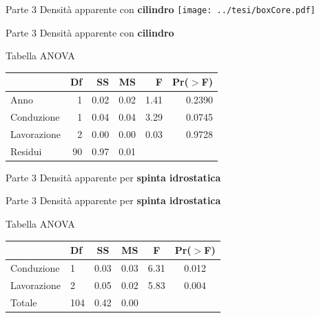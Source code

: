 \documentclass[xcolor={usenames, table, x11names}, final, 10pt]{beamer}
\begin{document}
\begin{frame}[label=Core]{Parte 3 \small{Densità apparente con \bf{\large{cilindro}}}}
  \hyperlink{finale}{}  
  \centering
  \texttt{[image: ../tesi/boxCore.pdf]}
  
\end{frame}

\begin{frame}{Parte 3 \small{Densità apparente con  \bf{\large{cilindro}}}}

  Tabella ANOVA

  \begin{table}[ht]
    \centering
    \label{tab:anova del modello}
    \begin{tabular}{lrrrrr}
      \toprule
      & Df & SS & MS & F  & Pr($>$F) \\ 
      \midrule 
      Anno         & 1  &  0.02  &  0.02  &   1.41   & 0.2390   \\ 
      Conduzione   & 1  &  0.04  &  0.04  &   3.29   & 0.0745   \\ 
      Lavorazione  & 2  &  0.00  &  0.00  &   0.03   & 0.9728   \\ 
      Residui      & 90 &  0.97  &  0.01  &          &          \\ 
      \bottomrule
    \end{tabular}
  \end{table}
\end{frame}

\begin{frame}[label=Clod]{Parte 3 \small{Densità apparente per \bf{\large{spinta idrostatica}}}}
  \hyperlink{finale}{}
\end{frame}

\begin{frame}{Parte 3 \small{Densità apparente per \bf{\large{spinta idrostatica}}}}

  Tabella ANOVA

  
  \begin{table}
    \centering
    \begin{tabular}{llcccc}
      \toprule
      & Df  & SS & MS & F & Pr($>$F) \\ 
      \midrule
      Conduzione  & 1   & 0.03   & 0.03    & 6.31    & 0.012    \\ 
      Lavorazione & 2   & 0.05   & 0.02    & 5.83    & 0.004    \\ 
      Totale      & 104 & 0.42   & 0.00    &         &          \\ 
      \bottomrule
    \end{tabular}
    \label{tab:Anova densita per spinta}
  \end{table}

\end{frame}
\end{document}
